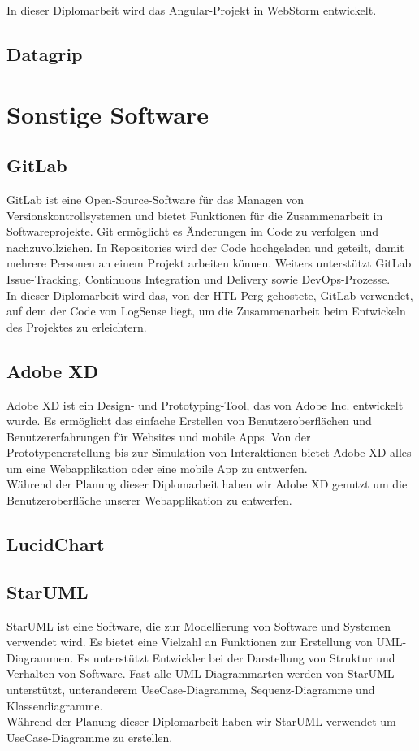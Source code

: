 \documentclass{report}
\begin{document}
In dieser Diplomarbeit wird das Angular-Projekt in WebStorm entwickelt.
\subsection{Datagrip}
\section{Sonstige Software}
\subsection{GitLab}
GitLab ist eine Open-Source-Software für das Managen von Versionskontrollsystemen und bietet Funktionen für die Zusammenarbeit in Softwareprojekte. Git ermöglicht es Änderungen im Code zu verfolgen und nachzuvollziehen. In Repositories wird der Code hochgeladen und geteilt, damit mehrere Personen an einem Projekt arbeiten können. Weiters unterstützt GitLab Issue-Tracking, Continuous Integration und Delivery sowie DevOps-Prozesse.
\\
In dieser Diplomarbeit wird das, von der HTL Perg gehostete, GitLab verwendet, auf dem der Code von LogSense liegt, um die Zusammenarbeit beim Entwickeln des Projektes zu erleichtern.
\subsection{Adobe XD}
Adobe XD ist ein Design- und Prototyping-Tool, das von Adobe Inc. entwickelt wurde. Es ermöglicht das einfache Erstellen von Benutzeroberflächen und Benutzererfahrungen für Websites und mobile Apps. Von der Prototypenerstellung bis zur Simulation von Interaktionen bietet Adobe XD alles um eine Webapplikation oder eine mobile App zu entwerfen. 
\\Während der Planung dieser Diplomarbeit haben wir Adobe XD genutzt um die Benutzeroberfläche unserer Webapplikation zu entwerfen.
\subsection{LucidChart}
\subsection{StarUML}
StarUML ist eine Software, die zur Modellierung von Software und Systemen verwendet wird. Es bietet eine Vielzahl an Funktionen zur Erstellung von UML-Diagrammen. Es unterstützt Entwickler bei der Darstellung von Struktur und Verhalten von Software. Fast alle UML-Diagrammarten werden von StarUML unterstützt, unteranderem UseCase-Diagramme, Sequenz-Diagramme und Klassendiagramme.
\\
Während der Planung dieser Diplomarbeit haben wir StarUML verwendet um UseCase-Diagramme zu erstellen.
\end{document}
